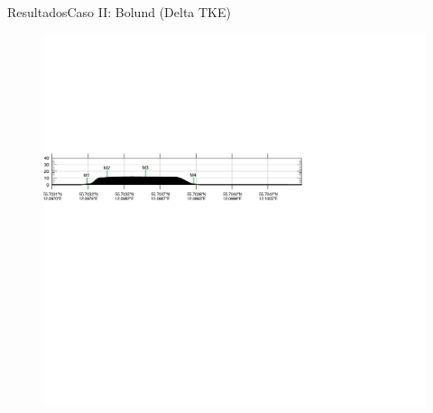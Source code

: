 \documentclass[mathserif,10pt]{beamer}
\begin{document}
\begin{frame}{Resultados}{Caso II: Bolund (Delta TKE)}
\begin{figure}[H]
		\includegraphics[width=0.65\linewidth,trim={-13.3mm 193mm 115mm 112mm},clip]{fig/06/bol/cross_height}\\%
		\label{fig:06_bol_tke}
	\end{figure}
\end{frame}
\end{document}
